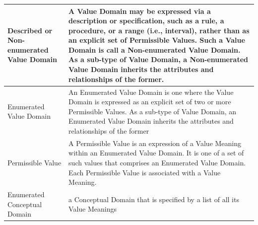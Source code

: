 \documentclass{article}
\begin{document}
\begin{table}[!htbp]
\begin{center}
\begin{tabular}{ p{6cm} | p{8cm}  }
				\hline
				Described or Non-enumerated Value Domain & A Value Domain may be expressed via a description or specification, such as a rule, a procedure, or a range (i.e., interval), rather than as an explicit set of Permissible Values. Such a Value Domain is call a Non-enumerated Value Domain. As a sub-type of Value Domain, a Non-enumerated Value Domain inherits the attributes and relationships of the former.    \\
				\hline
				Enumerated Value Domain & An Enumerated Value Domain is one where the Value Domain is expressed as an explicit set of two or more Permissible Values. As a sub-type of Value Domain, an Enumerated Value Domain inherits the attributes and relationships of the former    \\
				\hline
				Permissible Value &A Permissible Value is an expression of a Value Meaning within an Enumerated Value Domain. It is one of a set of such values that comprises an Enumerated Value Domain. Each Permissible Value is associated with a Value Meaning.   \\
				\hline
				Enumerated Conceptual Domain &  a Conceptual Domain that is specified by a list of all its Value Meanings  \\
				\hline
			\end{tabular}
		\end{center}
	\end{table}
\FloatBarrier
\end{document}
